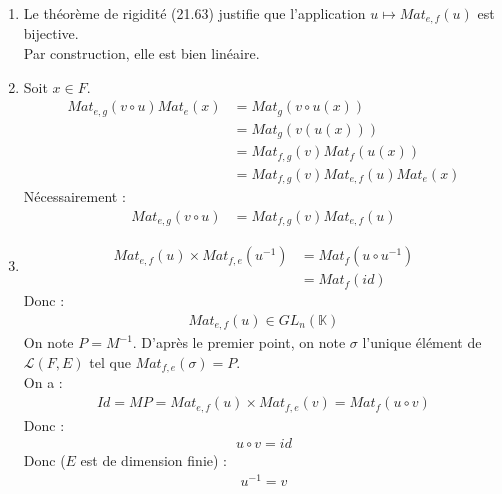 \documentclass[../main.tex]{subfiles}
\begin{document}
\begin{enumerate}
    \item Le théorème de rigidité (21.63) justifie que l'application $u\mapsto Mat_{e,f}(u)$ est bijective. \\
    Par construction, elle est bien linéaire. 

    \item Soit $x\in F$. 
    \begin{align*}
        Mat_{e,g}(v\circ u)Mat_e(x) &= Mat_g(v\circ u(x)) \\
        &= Mat_g(v(u(x))) \\
        &= Mat_{f,g}(v)Mat_f(u(x)) \\
        &= Mat_{f,g}(v)Mat_{e,f}(u)Mat_e(x)
    \end{align*}
    Nécessairement : 
    \begin{align*}
        Mat_{e,g}(v\circ u) &= Mat_{f,g}(v)Mat_{e,f}(u)
    \end{align*}

    \item \begin{align*}
        Mat_{e,f}(u) \times Mat_{f,e}(u^{-1}) &= Mat_{f}(u\circ u^{-1}) \\
        &= Mat_f(id)
    \end{align*}
    Donc : 
    \begin{align*}
        Mat_{e,f}(u)\in GL_n(\mathbb{K})
    \end{align*}
    On note $P = M^{-1}$. D'après le premier point, on note $\sigma$ l'unique élément de $\mathcal{L}(F, E)$ tel que $Mat_{f,e}(\sigma) = P$. \\
    On a : 
    \begin{align*}
        Id = MP = Mat_{e,f}(u)\times Mat_{f,e}(v) = Mat_f(u\circ v)
    \end{align*}
    Donc : 
    \begin{align*}
        u\circ v = id
    \end{align*}
    Donc ($E$ est de dimension finie) :
    \begin{align*}
        u^{-1} = v
    \end{align*}
\end{enumerate}
\end{document}
